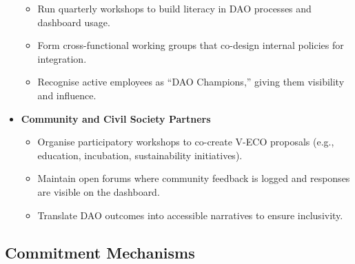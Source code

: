\documentclass[
  english,
  12pt,
  oneside,
  open=any]{scrbook}
\providecommand{\tightlist}{%
  \setlength{\itemsep}{0pt}\setlength{\parskip}{0pt}}\usepackage{longtable,booktabs,array}
\begin{document}
\begin{itemize}
  \begin{itemize}
  \tightlist
  \item
    Run quarterly workshops to build literacy in DAO processes and
    dashboard usage.\\
  \item
    Form cross-functional working groups that co-design internal
    policies for integration.\\
  \item
    Recognise active employees as ``DAO Champions,'' giving them
    visibility and influence.
  \end{itemize}
\item
  \textbf{Community and Civil Society Partners}

  \begin{itemize}
  \tightlist
  \item
    Organise participatory workshops to co-create V-ECO proposals (e.g.,
    education, incubation, sustainability initiatives).\\
  \item
    Maintain open forums where community feedback is logged and
    responses are visible on the dashboard.\\
  \item
    Translate DAO outcomes into accessible narratives to ensure
    inclusivity.
  \end{itemize}
\end{itemize}

\subsection{Commitment Mechanisms}\label{commitment-mechanisms}
\end{document}

